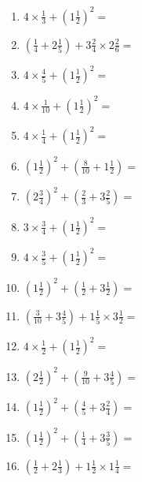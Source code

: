 \documentclass[12pt]{article}
\begin{document}
\begin{enumerate}
\item \large $ 4 \times \frac{1}{3} + (1 \frac{1}{2})^2 = $ \vspace{1.8cm}
\item \large $ (\frac{1}{4} + 2 \frac{1}{5}) + 3 \frac{2}{4} \times 2 \frac{2}{6} = $ \vspace{1.8cm}
\item \large $ 4 \times \frac{4}{5} + (1 \frac{1}{2})^2 = $ \vspace{1.8cm}
\item \large $ 4 \times \frac{1}{10} + (1 \frac{1}{2})^2 = $ \vspace{1.8cm}
\item \large $ 4 \times \frac{1}{4} + (1 \frac{1}{2})^2 = $ \vspace{1.8cm}
\item \large $ (1 \frac{1}{2})^2 + (\frac{8}{10} + 1 \frac{1}{2}) = $ \vspace{1.8cm}
\newpage
\item \large $ (2 \frac{3}{4})^2 + (\frac{2}{3} + 3 \frac{2}{5}) = $ \vspace{1.8cm}
\item \large $ 3 \times \frac{3}{4} + (1 \frac{1}{2})^2 = $ \vspace{1.8cm}
\item \large $ 4 \times \frac{3}{5} + (1 \frac{1}{2})^2 = $ \vspace{1.8cm}
\item \large $ (1 \frac{1}{2})^2 + (\frac{1}{2} + 3 \frac{1}{2}) = $ \vspace{1.8cm}
\item \large $ (\frac{3}{10} + 3 \frac{4}{5}) + 1 \frac{1}{5} \times 3 \frac{1}{2} = $ \vspace{1.8cm}
\item \large $ 4 \times \frac{1}{2} + (1 \frac{1}{2})^2 = $ \vspace{1.8cm}
\item \large $ (2 \frac{1}{2})^2 + (\frac{9}{10} + 3 \frac{4}{5}) = $ \vspace{1.8cm}
\item \large $ (1 \frac{1}{2})^2 + (\frac{4}{5} + 3 \frac{2}{4}) = $ \vspace{1.8cm}
\item \large $ (1 \frac{1}{2})^2 + (\frac{1}{4} + 3 \frac{3}{5}) = $ \vspace{1.8cm}
\item \large $ (\frac{1}{2} + 2 \frac{1}{3}) + 1 \frac{1}{2} \times 1 \frac{1}{4} = $ \vspace{1.8cm}

\end{enumerate}
\end{document}
